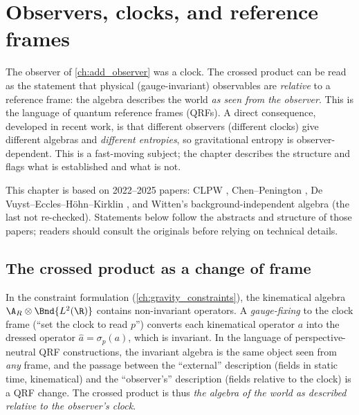 \chapter{Observers, clocks, and reference frames}\label{ch:clocks_qrf}

\begin{physmotiv}
The observer of \cref{ch:add_observer} was a clock. The crossed product can be read as the statement that physical (gauge-invariant) observables are \emph{relative} to a reference frame: the algebra describes the world \emph{as seen from the observer}. This is the language of quantum reference frames (QRFs). A direct consequence, developed in recent work, is that different observers (different clocks) give different algebras and \emph{different entropies}, so gravitational entropy is observer-dependent. This is a fast-moving subject; the chapter describes the structure and flags what is established and what is not.
\end{physmotiv}

\begin{unsettled}
This chapter is based on 2022--2025 papers: CLPW \cite{CLPW2023}, Chen--Penington \cite{ChenPenington2024}, De Vuyst--Eccles--H\"ohn--Kirklin \cite{DEHK2024a,DEHK2024b}, and Witten's background-independent algebra \cite{Witten2023bg} (the last not re-checked). Statements below follow the abstracts and structure of those papers; readers should consult the originals before relying on technical details.
\end{unsettled}

\section{The crossed product as a change of frame}

In the constraint formulation (\cref{ch:gravity_constraints}), the kinematical algebra $\A_R\otimes\Bnd{L^2(\R)}$ contains non-invariant operators. A \emph{gauge-fixing} to the clock frame (``set the clock to read $p$'') converts each kinematical operator $a$ into the dressed operator $\hat a=\sigma_p(a)$, which is invariant. In the language of perspective-neutral QRF constructions, the invariant algebra is the same object seen from \emph{any} frame, and the passage between the ``external'' description (fields in static time, kinematical) and the ``observer's'' description (fields relative to the clock) is a QRF change. The crossed product is thus \emph{the algebra of the world as described relative to the observer's clock}.

